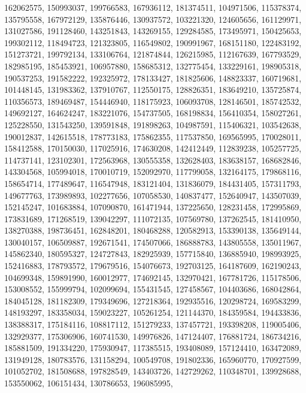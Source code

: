 {{    162062575, 150993037, 199766583, 167936112, 181374511, 104971506,
    115378374, 135795558, 167972129, 135876446, 130937572, 103221320,
    124605656, 161129971, 131027586, 191128460, 143251843, 143269155,
    129284585, 173495971, 150425653, 199302112, 118494723, 121323805,
    116549802, 190991967, 168151180, 122483192, 151273721, 199792134,
    133106764, 121874844, 126215985, 112167639, 167793529, 182985195,
    185453921, 106957880, 158685312, 132775454, 133229161, 198905318,
    190537253, 191582222, 192325972, 178133427, 181825606, 148823337,
    160719681, 101448145, 131983362, 137910767, 112550175, 128826351,
    183649210, 135725874, 110356573, 189469487, 154446940, 118175923,
    106093708, 128146501, 185742532, 149692127, 164624247, 183221076,
    154737505, 168198834, 156410354, 158027261, 125228550, 131543250,
    139591848, 191898263, 104987591, 115406321, 103542638, 190012837,
    142615518, 178773183, 175862355, 117537850, 169565995, 170028011,
    158412588, 170150030, 117025916, 174630208, 142412449, 112839238,
    105257725, 114737141, 123102301, 172563968, 130555358, 132628403,
    183638157, 168682846, 143304568, 105994018, 170010719, 152092970,
    117799058, 132164175, 179868116, 158654714, 177489647, 116547948,
    183121404, 131836079, 184431405, 157311793, 149677763, 173989893,
    102277656, 107058530, 140837477, 152640947, 143507039, 152145247,
    101683884, 107090870, 161471944, 137225650, 128231458, 172995869,
    173831689, 171268519, 139042297, 111072135, 107569780, 137262545,
    181410950, 138270388, 198736451, 162848201, 180468288, 120582913,
    153390138, 135649144, 130040157, 106509887, 192671541, 174507066,
    186888783, 143805558, 135011967, 145862340, 180595327, 124727843,
    182925939, 157715840, 136885940, 198993925, 152416883, 178793572,
    179679516, 154076673, 192703125, 164187609, 162190243, 104699348,
    159891990, 160012977, 174692145, 132970421, 167781726, 115178506,
    153008552, 155999794, 102099694, 155431545, 127458567, 104403686,
    168042864, 184045128, 181182309, 179349696, 127218364, 192935516,
    120298724, 169583299, 148193297, 183358034, 159023227, 105261254,
    121144370, 184359584, 194433836, 138388317, 175184116, 108817112,
    151279233, 137457721, 193398208, 119005406, 132929377, 175306906,
    160741530, 149976826, 147124407, 176881724, 186734216, 185881509,
    191334220, 175930947, 117385515, 193408089, 157124410, 163472089,
    131949128, 180783576, 131158294, 100549708, 191802336, 165960770,
    170927599, 101052702, 181508688, 197828549, 143403726, 142729262,
    110348701, 139928688, 153550062, 106151434, 130786653, 196085995,
}}
